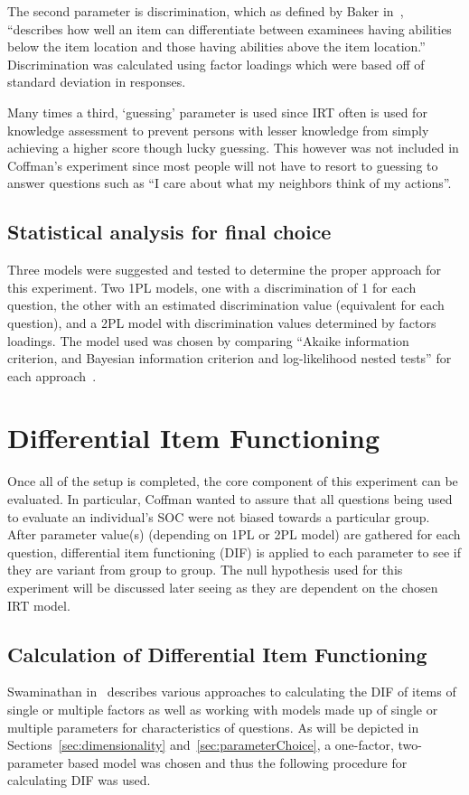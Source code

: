 \documentclass{sig-alternate}
\begin{document}
The second parameter is discrimination, which as defined by Baker in~\cite{irt:2001}, ``describes how well an item can differentiate between examinees having abilities below the item location and those having abilities above the item location.'' Discrimination was calculated using factor loadings which were based off of standard deviation in responses.

Many times a third, `guessing' parameter is used since IRT often is used for knowledge assessment to prevent persons with lesser knowledge from simply achieving a higher score though lucky guessing. This however was not included in Coffman's experiment since most people will not have to resort to guessing to answer questions such as ``I care about what my neighbors think of my actions''.

\subsection{Statistical analysis for final choice}
\label{sec:irtModel}
Three models were suggested and tested to determine the proper approach for this experiment. Two 1PL models, one with a discrimination of 1 for each question, the other with an estimated discrimination value (equivalent for each question), and a 2PL model with discrimination values determined by factors loadings. The model used was chosen by comparing ``Akaike information criterion, and Bayesian information criterion and log-likelihood nested tests'' for each approach~\cite{disparities:2009}.



\section{Differential Item Functioning}
\label{sec:dif}
Once all of the setup is completed, the core component of this experiment can be evaluated. In particular, Coffman wanted to assure that all questions being used to evaluate an individual's SOC were not biased towards a particular group. After parameter value(s) (depending on 1PL or 2PL model) are gathered for each question, differential item functioning (DIF) is applied to each parameter to see if they are variant from group to group. The null hypothesis used for this experiment will be discussed later seeing as they are dependent on the chosen IRT model.

\subsection{Calculation of Differential Item Functioning}
Swaminathan in~\cite{logisticDIF:1990} describes various approaches to calculating the DIF of items of single or multiple factors as well as working with models made up of single or multiple parameters for characteristics of questions. As will be depicted in Sections~\ref{sec:dimensionality} and~\ref{sec:parameterChoice}, a one-factor, two-parameter based model was chosen and thus the following procedure for calculating DIF was used. 
\end{document}
